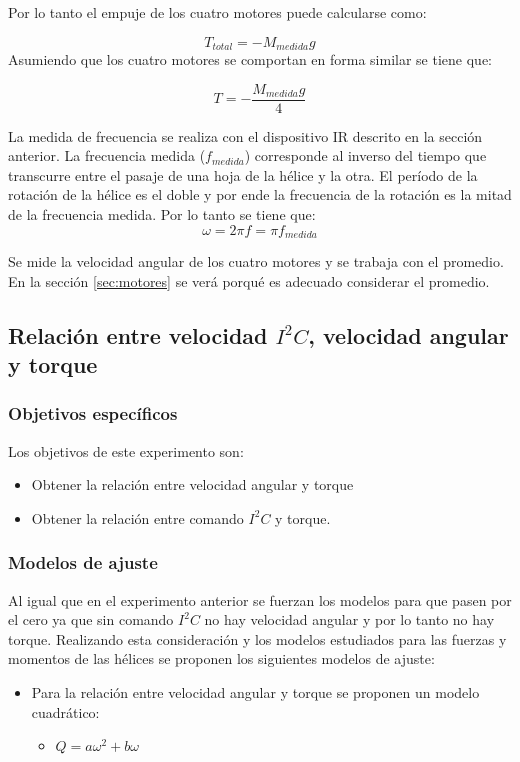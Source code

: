 \documentclass[main]{subfiles}
\begin{document}
Por lo tanto el empuje de los cuatro motores puede calcularse como:

$$
T_{total}=-M_{medida}g
$$
Asumiendo que los cuatro motores se comportan en forma similar se tiene que:

$$
T=-\frac{M_{medida}g}{4}
$$

La medida de frecuencia se realiza con el dispositivo IR descrito en la secci\'on anterior. La frecuencia medida ($f_{medida}$) corresponde al inverso del tiempo que transcurre entre el pasaje de una hoja de la h\'elice y la otra. El per\'iodo de la rotaci\'on de la h\'elice es el doble y por ende la frecuencia de la rotaci\'on es la mitad de la frecuencia medida. Por lo tanto se tiene que:
$$
\omega=2\pi f=\pi f_{medida}
$$

Se mide la velocidad angular de los cuatro motores y se trabaja con el promedio. En la secci\'on \ref{sec:motores} se ver\'a porqu\'e es adecuado considerar el promedio.

\subsection{Relaci\'on entre velocidad $I^2C$, velocidad angular y torque}

\subsubsection*{Objetivos espec\'ificos}
Los objetivos de este experimento son:

\begin{itemize}
\item Obtener la relaci\'on entre velocidad angular y torque
\item Obtener la relaci\'on entre comando $I^2C$ y torque.
\end{itemize}


\subsubsection*{Modelos de ajuste}
Al igual que en el experimento anterior se fuerzan los modelos para que pasen por el cero ya que sin comando $I^2C$ no hay velocidad angular y por lo tanto no hay torque. Realizando esta consideraci\'on y los modelos estudiados para las fuerzas y momentos de las h\'elices se proponen los siguientes modelos de ajuste:

\begin{itemize}
\item Para la relaci\'on entre velocidad angular y torque se proponen un modelo cuadr\'atico:
	\begin{itemize}
	\item $Q=a\omega^2+b\omega$
	\end{itemize}
\end{itemize}
\end{document}
